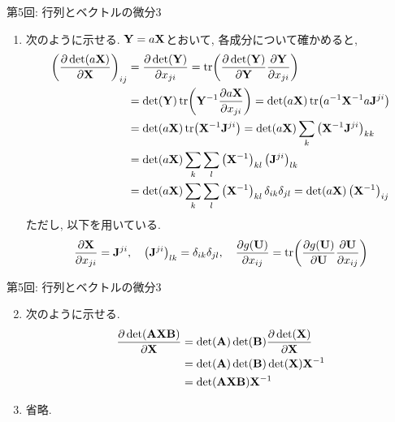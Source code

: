 \documentclass[dvipdfmx,notheorems,t]{beamer}
\begin{document}
\begin{frame}{第5回: 行列とベクトルの微分3}
\begin{enumerate}
  \item 次のように示せる. $\vb{Y} = a \vb{X}$とおいて, 各成分について確かめると,
  {\small \begin{align*}
    \left( \pdv{\det(a \vb{X})}{\vb{X}} \right)_{ij}
      &= \pdv{\det(\vb{Y})}{x_{ji}}
      = \tr(\pdv{\det(\vb{Y})}{\vb{Y}} \pdv{\vb{Y}}{x_{ji}}) \\
      &= \det(\vb{Y}) \tr(\vb{Y}^{-1} \pdv{a \vb{X}}{x_{ji}})
      = \det(a \vb{X}) \tr(a^{-1} \vb{X}^{-1} a \vb{J}^{ji}) \\
      &= \det(a \vb{X}) \tr(\vb{X}^{-1} \vb{J}^{ji})
      = \det(a \vb{X}) \sum_k \left( \vb{X}^{-1} \vb{J}^{ji} \right)_{kk} \\
      &= \det(a \vb{X}) \sum_k \sum_l \left( \vb{X}^{-1} \right)_{kl} \left( \vb{J}^{ji} \right)_{lk} \\
      &= \det(a \vb{X}) \sum_k \sum_l \left( \vb{X}^{-1} \right)_{kl} \delta_{ik} \delta_{jl}
      = \det(a \vb{X}) \left( \vb{X}^{-1} \right)_{ij}
  \end{align*}}
  ただし, 以下を用いている.
  {\small \begin{align*}
    \pdv{\vb{X}}{x_{ji}} = \vb{J}^{ji}, \quad
    \left( \vb{J}^{ji} \right)_{lk} = \delta_{ik} \delta_{jl}, \quad
    \pdv{g(\vb{U})}{x_{ij}} = \tr(\pdv{g(\vb{U})}{\vb{U}} \pdv{\vb{U}}{x_{ij}})
  \end{align*}}
\end{enumerate}
\end{frame}

\begin{frame}{第5回: 行列とベクトルの微分3}
\begin{enumerate}
  \setcounter{enumi}{1}
  \item 次のように示せる.
  \begin{align*}
    \pdv{\det(\vb{A} \vb{X} \vb{B})}{\vb{X}} &= \det(\vb{A}) \det(\vb{B}) \pdv{\det(\vb{X})}{\vb{X}} \\
      &= \det(\vb{A}) \det(\vb{B}) \det(\vb{X}) \vb{X}^{-1} \\
      &= \det(\vb{A} \vb{X} \vb{B}) \vb{X}^{-1}
  \end{align*}

  \item 省略.
\end{enumerate}
\end{frame}
\end{document}
